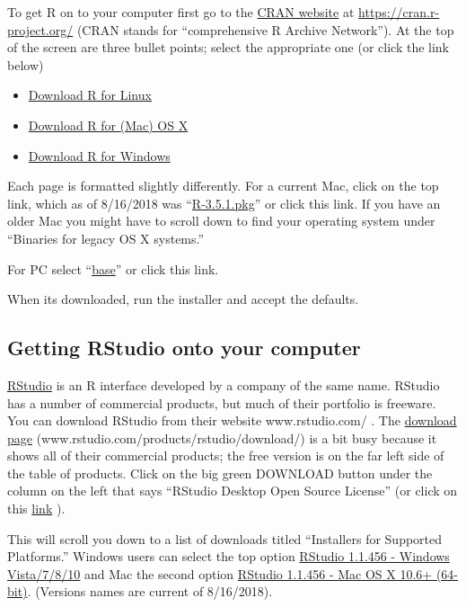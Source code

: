 \documentclass[
]{book}
\providecommand{\tightlist}{%
  \setlength{\itemsep}{0pt}\setlength{\parskip}{0pt}}
\begin{document}
To get R on to your computer first go to the \href{https://cran.r-project.org/}{CRAN website} at \url{https://cran.r-project.org/} (CRAN stands for ``comprehensive R Archive Network''). At the top of the screen are three bullet points; select the appropriate one (or click the link below)

\begin{itemize}
\tightlist
\item
  \href{https://cran.r-project.org/bin/linux/}{Download R for Linux}
\item
  \href{https://cran.r-project.org/bin/macosx/}{Download R for (Mac) OS X}
\item
  \href{https://cran.r-project.org/bin/windows/}{Download R for Windows}
\end{itemize}

Each page is formatted slightly differently. For a current Mac, click on the top link, which as of 8/16/2018 was ``\href{https://cran.r-project.org/bin/macosx/R-3.5.1.pkg}{R-3.5.1.pkg}'' or click this link. If you have an older Mac you might have to scroll down to find your operating system under ``Binaries for legacy OS X systems.''

For PC select ``\href{https://cran.r-project.org/bin/windows/base/}{base}'' or click this link.

When its downloaded, run the installer and accept the defaults.

\hypertarget{getting-rstudio-onto-your-computer}{%
\subsection{Getting RStudio onto your computer}\label{getting-rstudio-onto-your-computer}}

\href{www.rstudio.com/}{RStudio} is an R interface developed by a company of the same name. RStudio has a number of commercial products, but much of their portfolio is freeware. You can download RStudio from their website www.rstudio.com/ . The \href{https://www.rstudio.com/products/rstudio/download/}{download page} (www.rstudio.com/products/rstudio/download/) is a bit busy because it shows all of their commercial products; the free version is on the far left side of the table of products. Click on the big green DOWNLOAD button under the column on the left that says ``RStudio Desktop Open Source License'' (or click on this \href{https://www.rstudio.com/products/rstudio/download/\#download}{link} ).

This will scroll you down to a list of downloads titled ``Installers for Supported Platforms.'' Windows users can select the top option \href{https://download1.rstudio.org/RStudio-1.1.456.exe}{RStudio 1.1.456 - Windows Vista/7/8/10} and Mac the second option \href{https://download1.rstudio.org/RStudio-1.1.456.dmg}{RStudio 1.1.456 - Mac OS X 10.6+ (64-bit)}. (Versions names are current of 8/16/2018).
\end{document}
